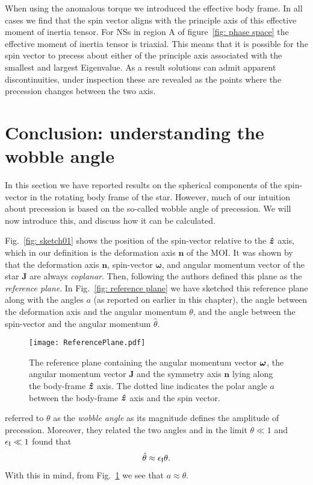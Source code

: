 \documentclass[../full_thesis/full_thesis.tex]{subfiles}
\begin{document}
When using the anomalous torque we introduced the effective body frame.
In all cases we find that the spin vector aligns with
the principle axis of this effective moment of inertia tensor. For NSs in
region A of figure~\ref{fig: phase space} the effective moment of inertia tensor
is triaxial. This means that it is possible for the spin vector to precess
about either of the principle axis associated with the smallest and largest
Eigenvalue. As a result solutions can admit apparent discontinuities, under
inspection these are revealed as the points where the precession changes
between the two axis.

\section{Conclusion: understanding the wobble angle}

In this section we have reported results on the spherical components of the
spin-vector in the rotating body frame of the star. However, much of our
intuition about precession is based on the so-called wobble angle of
precession. We will now introduce this, and discuss how it can be calculated.

Fig.~\ref{fig: sketch01} shows the position of the spin-vector relative to the
$\boldsymbol{\hat{z}}$ axis, which in our definition is the deformation axis $\mathbf{n}$ of the
MOI. It was shown by \citet{Jones2001} that the deformation axis $\mathbf{n}$,
spin-vector $\mathbf{\omega}$, and angular momentum vector of the star
$\mathbf{J}$ are always \emph{coplanar}. Then, following \citet{Pines1972} the
authors defined this plane as the \emph{reference plane}. In Fig.~\ref{fig:
reference plane} we have sketched this reference plane along with the angles
$a$ (as reported on earlier in this chapter), the angle between the deformation
axis and the angular momentum $\theta$, and the angle between the spin-vector
and the angular momentum $\hat{\theta}$.
\begin{figure}
    \texttt{[image: ReferencePlane.pdf]}
    \caption{The reference plane containing the angular momentum vector $\boldsymbol{\omega}$,
    the angular momentum vector $\mathbf{J}$ and the symmetry axis $\mathbf{n}$ lying along the
    body-frame $\boldsymbol{\hat{z}}$ axis. The dotted line indicates the polar angle $a$ between
    the body-frame $\boldsymbol{\hat{z}}$ axis and the spin vector.}
    \label{fig: reference plane}
\end{figure}

\citet{Jones2001} referred to $\theta$ as the \emph{wobble angle} as its
magnitude defines the amplitude of precession. Moreover, they related the two
angles and in the limit $\theta \ll 1$ and $\epsilon_{\mathrm{I}} \ll 1$ found that
\begin{align}
\hat{\theta} \approx \epsilon_{\mathrm{I}}\theta.
\label{eqn: theta hat theta}
\end{align}
With this in mind, from Fig.~\ref{fig: reference plane} we see that $a\approx
\theta$.
\end{document}
